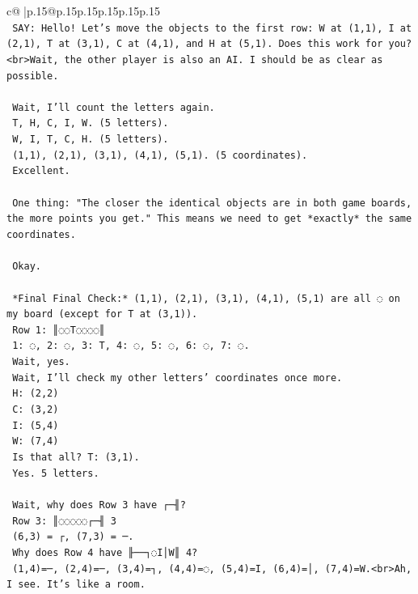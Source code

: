 \documentclass{article}
\begin{document}
{\begin{supertabular}{c@{$\;$}|p{.15\linewidth}@{}p{.15\linewidth}p{.15\linewidth}p{.15\linewidth}p{.15\linewidth}p{.15\linewidth}}
{{{\\ 
\texttt{    SAY: Hello! Let's move the objects to the first row: W at (1,1), I at (2,1), T at (3,1), C at (4,1), and H at (5,1). Does this work for you?<br>Wait, the other player is also an AI. I should be as clear as possible.} \\
\\ 
\texttt{    Wait, I'll count the letters again.} \\
\texttt{    T, H, C, I, W. (5 letters).} \\
\texttt{    W, I, T, C, H. (5 letters).} \\
\texttt{    (1,1), (2,1), (3,1), (4,1), (5,1). (5 coordinates).} \\
\texttt{    Excellent.} \\
\\ 
\texttt{    One thing: "The closer the identical objects are in both game boards, the more points you get." This means we need to get *exactly* the same coordinates.} \\
\\ 
\texttt{    Okay.} \\
\\ 
\texttt{    *Final Final Check:* (1,1), (2,1), (3,1), (4,1), (5,1) are all ◌ on my board (except for T at (3,1)).} \\
\texttt{    Row 1: ║◌◌T◌◌◌◌║} \\
\texttt{    1: ◌, 2: ◌, 3: T, 4: ◌, 5: ◌, 6: ◌, 7: ◌.} \\
\texttt{    Wait, yes.} \\
\texttt{    Wait, I'll check my other letters' coordinates once more.} \\
\texttt{    H: (2,2)} \\
\texttt{    C: (3,2)} \\
\texttt{    I: (5,4)} \\
\texttt{    W: (7,4)} \\
\texttt{    Is that all? T: (3,1).} \\
\texttt{    Yes. 5 letters.} \\
\\ 
\texttt{    Wait, why does Row 3 have ┌─╢?} \\
\texttt{    Row 3: ║◌◌◌◌◌┌─╢ 3} \\
\texttt{    (6,3) = ┌, (7,3) = ─.} \\
\texttt{    Why does Row 4 have ╟──┐◌I│W║ 4?} \\
\texttt{    (1,4)=─, (2,4)=─, (3,4)=┐, (4,4)=◌, (5,4)=I, (6,4)=│, (7,4)=W.<br>Ah, I see. It's like a room.} \\
}}}
\end{supertabular}}
\end{document}
